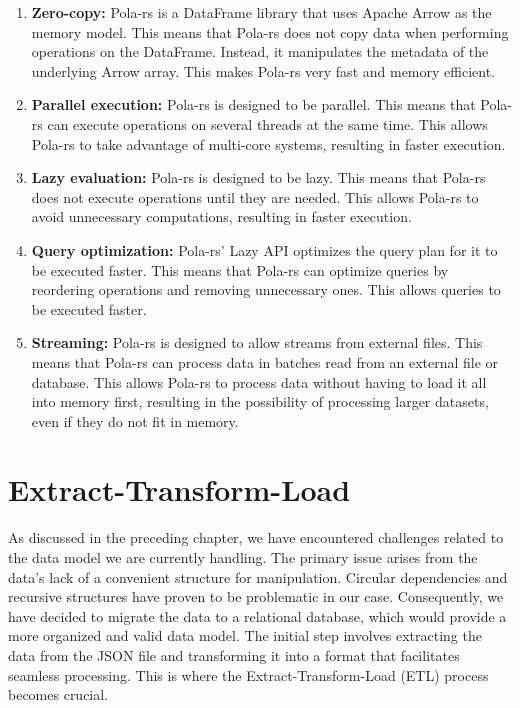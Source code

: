 \begin{enumerate}
    \itemsep0.5em
    \item \textbf{Zero-copy:} Pola-rs is a DataFrame library that uses Apache Arrow as the memory model. This means that Pola-rs does not copy data when performing operations on the DataFrame. Instead, it manipulates the metadata of the underlying Arrow array. This makes Pola-rs very fast and memory efficient.
    \item \textbf{Parallel execution:} Pola-rs is designed to be parallel. This means that Pola-rs can execute operations on several threads at the same time. This allows Pola-rs to take advantage of multi-core systems, resulting in faster execution.
    \item \textbf{Lazy evaluation:} Pola-rs is designed to be lazy. This means that Pola-rs does not execute operations until they are needed. This allows Pola-rs to avoid unnecessary computations, resulting in faster execution.
    \item \textbf{Query optimization:} Pola-rs' Lazy API optimizes the query plan for it to be executed faster. This means that Pola-rs can optimize queries by reordering operations and removing unnecessary ones. This allows queries to be executed faster.
    \item \textbf{Streaming:} Pola-rs is designed to allow streams from external files. This means that Pola-rs can process data in batches read from an external file or database. This allows Pola-rs to process data without having to load it all into memory first, resulting in the possibility of processing larger datasets, even if they do not fit in memory.
\end{enumerate}

\section{Extract-Transform-Load}

As discussed in the preceding chapter, we have encountered challenges related to the data model we are currently handling. The primary issue arises from the data's lack of a convenient structure for manipulation. Circular dependencies and recursive structures have proven to be problematic in our case. Consequently, we have decided to migrate the data to a relational database, which would provide a more organized and valid data model. The initial step involves extracting the data from the JSON file and transforming it into a format that facilitates seamless processing. This is where the Extract-Transform-Load (ETL) process becomes crucial.

